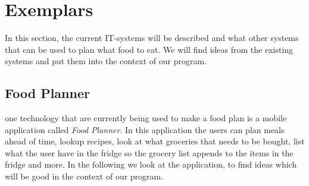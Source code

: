 \section{Exemplars}
In this section, the current IT-systems will be described and what other systems that can be used to plan what food to eat. We will find ideas from the existing systems and put them into the context of our program. 

\subsection{Food Planner}
one technology that are currently being used to make a food plan is a mobile application called \textit{Food Planner}.
In this application the users can plan meals ahead of time, lookup recipes, look at what groceries that needs to be bought,
list what the user have in the fridge so the grocery list appends to the items in the fridge and more. In the following we look at the application, to find ideas which will be good in the context of our program.

